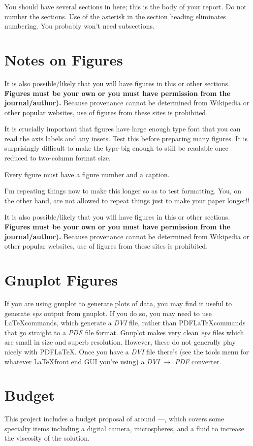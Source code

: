 \documentclass[aps,prb,twocolumn,groupedaddress,nofootinbib,floatfix]{revtex4}
\begin{document}
You should have several sections in here; this is the body of your report.   Do not number the sections.
Use of the asterisk in the section heading eliminates numbering.   You probably won't need subsections.
%
\section*{Notes on Figures}
It is also possible/likely that you will have figures in this or other
sections.  \textbf{Figures must be your own or you
must have permission from the journal/author).}  Because provenance
cannot be determined from Wikipedia or other popular websites, use of
figures from these sites is prohibited.   

It is crucially important that figures have large enough type font that you can read the axis labels and any insets.   Test this before preparing many figures.   It is surprisingly difficult to make the type big enough to still be readable once reduced to two-column format size.

Every figure must have a figure number and a caption.

I'm repeating things now to make this longer so as to test formatting.  You, on the other hand, are not allowed to repeat things just to make your paper longer!!

It is also possible/likely that you will have figures in this or other
sections.  \textbf{Figures must be your own or you
must have permission from the journal/author).}  Because provenance
cannot be determined from Wikipedia or other popular websites, use of
figures from these sites is prohibited.   

\section*{Gnuplot Figures}
If you are using gnuplot to generate plots of data, you may find it useful to generate \textit{eps} output from gnuplot.   If you do so, you may need to use \LaTeX commands, which generate a \textit{DVI} file, rather than PDF\LaTeX commands that go straight to a \textit{PDF} file format.   Gnuplot makes very clean \textit{eps} files which are small in size and superb resolution.   However, these do not generally play nicely with PDF\LaTeX.    Once you have a \textit{DVI} file there's (see the tools menu for whatever \LaTeX front end GUI you're using) a \textit{DVI} $\rightarrow$ \textit{PDF} converter.
\section*{Budget}
This project includes a budget proposal of around ---, which covers some specialty items including a digital camera, microspheres, and a fluid to increase the viscosity of the solution. 
\end{document}
